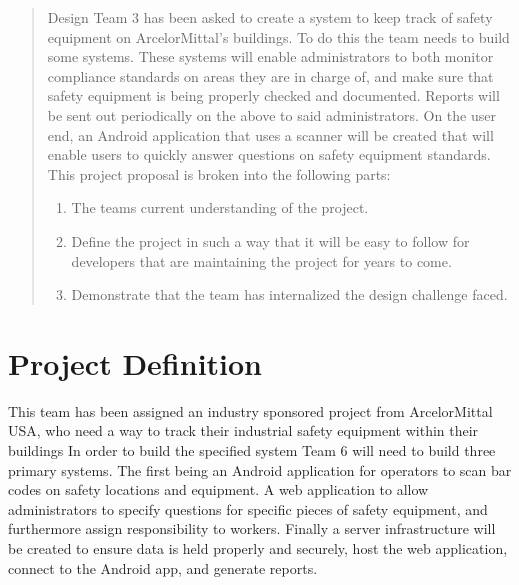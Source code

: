 \documentclass[Letter,11pt]{article}
\begin{document}
	
	\begin{abstract}
		Design Team 3 has been asked to create a system to keep track of safety equipment on ArcelorMittal's buildings. To do this the team needs to build some systems. These systems will enable administrators to both monitor compliance standards on areas they are in charge of, and make sure that safety equipment is being properly checked and documented. Reports will be sent out periodically on the above to said administrators.  On the user end, an Android application  that uses a scanner will be created that will enable users to quickly answer questions on safety equipment standards.  This project proposal is broken into the following parts:
		\begin{enumerate}
			\item The teams current understanding of the project.
			\item Define the project in such a way that it will be easy to follow for developers that are maintaining the project for years to come.
			\item Demonstrate that the team has internalized the design challenge faced.
		\end{enumerate}
	\end{abstract}

\section{Project Definition}\label{def}
	This team has been assigned an industry sponsored project from ArcelorMittal USA, who need a way to track their industrial safety equipment within their buildings In order to build the specified system Team 6 will need to build three primary systems. The first being an Android application for operators to scan bar codes on safety locations and equipment. A web application to allow administrators to specify questions for specific pieces of safety equipment, and furthermore assign responsibility to workers. Finally a server infrastructure will be created to ensure data is held properly and securely, host the web application, connect to the Android app, and generate reports. 
\end{document}
